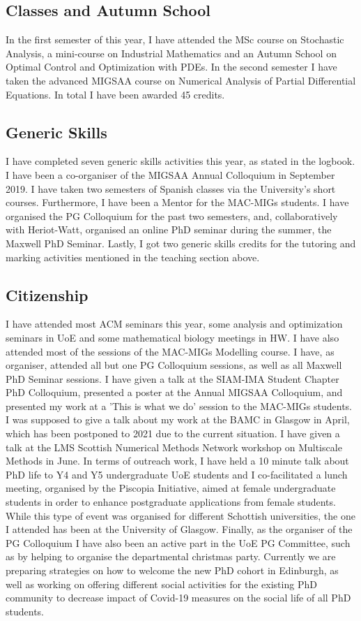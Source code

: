 \documentclass[11pt, a4paper]{article}
\theoremstyle{definition}
\begin{document}
\subsection{Classes and Autumn School}
In the first semester of this year, I have attended the MSc course on Stochastic Analysis, a mini-course on Industrial Mathematics and an Autumn School on Optimal Control and Optimization with PDEs. In the second semester I have taken the advanced MIGSAA course on Numerical Analysis of Partial Differential Equations. In total I have been awarded 45 credits.
\subsection{Generic Skills}
I have completed seven generic skills activities this year, as stated in the logbook. I have been a co-organiser of the MIGSAA Annual Colloquium in September 2019. I have taken two semesters of Spanish classes via the University's short courses. Furthermore, I have been a Mentor for the MAC-MIGs students. I have organised the PG Colloquium for the past two semesters, and, collaboratively with Heriot-Watt, organised an online PhD seminar during the summer, the Maxwell PhD Seminar.
Lastly, I got two generic skills credits for the tutoring and marking activities mentioned in the teaching section above.
\subsection{Citizenship}
I have attended most ACM seminars this year, some analysis and optimization seminars in UoE and some mathematical biology meetings in HW. I have also attended most of the sessions of the MAC-MIGs Modelling course. I have, as organiser, attended all but one PG Colloquium sessions, as well as all Maxwell PhD Seminar sessions.
I have given a talk at the SIAM-IMA Student Chapter PhD Colloquium, presented a poster at the Annual MIGSAA Colloquium, and presented my work at a 'This is what we do' session to the MAC-MIGs students. I was supposed to give a talk about my work at the BAMC in Glasgow in April, which has been postponed to 2021 due to the current situation. I have given a talk at the LMS Scottish Numerical Methods Network workshop on Multiscale Methods in June. In terms of outreach work, I have held a 10 minute talk about PhD life to Y4 and Y5 undergraduate UoE students and I co-facilitated a lunch meeting, organised by the Piscopia Initiative, aimed at female undergraduate students in order to enhance postgraduate applications from female students. While this type of event was organised for different Schottish universities, the one I attended has been at the University of Glasgow.
Finally, as the organiser of the PG Colloquium I have also been an active part in the UoE PG Committee, such as by helping to organise the departmental christmas party. Currently we are preparing strategies on how to welcome the new PhD cohort in Edinburgh, as well as working on offering different social activities for the existing PhD community to decrease impact of Covid-19 measures on the social life of all PhD students.
\end{document}
